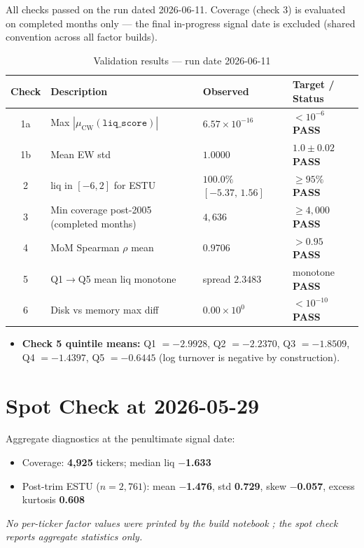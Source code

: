 \documentclass[11pt,a4paper]{article}
\newcommand{\PASS}[1]{\textcolor{pass}{\textbf{#1}}}
\newcommand{\NOTE}[1]{\textcolor{note}{\textit{#1}}}
\begin{document}
All checks passed on the run dated 2026-06-11. Coverage (check 3) is evaluated
on completed months only --- the final in-progress signal date is excluded
(shared convention across all factor builds).

\begin{table}[h!]
\centering
\caption{Validation results --- run date 2026-06-11}
\small
\begin{tabular}{clll}
\toprule
\textbf{Check} & \textbf{Description} & \textbf{Observed} & \textbf{Target / Status} \\
\midrule
1a & Max $|\mu_{\text{CW}}(\texttt{liq\_score})|$ & $6.57\times10^{-16}$ & $<10^{-6}$ \quad \PASS{PASS} \\
1b & Mean EW std & $1.0000$ & $1.0\pm0.02$ \quad \PASS{PASS} \\
2 & liq in $[-6,2]$ for ESTU & $100.0\%$ $[-5.37,\,1.56]$ & $\geq95\%$ \quad \PASS{PASS} \\
3 & Min coverage post-2005 (completed months) & $4{,}636$ & $\geq4{,}000$ \quad \PASS{PASS} \\
4 & MoM Spearman $\rho$ mean & $0.9706$ & $>0.95$ \quad \PASS{PASS} \\
5 & Q1$\to$Q5 mean liq monotone & spread $2.3483$ & monotone \quad \PASS{PASS} \\
6 & Disk vs memory max diff & $0.00\times10^{0}$ & $<10^{-10}$ \quad \PASS{PASS} \\
\bottomrule
\end{tabular}
\end{table}

\begin{itemize}[leftmargin=*,topsep=2pt,itemsep=2pt]
  \item \textbf{Check 5 quintile means:} Q1 $=-2.9928$, Q2 $=-2.2370$, Q3 $=-1.8509$, Q4 $=-1.4397$, Q5 $=-0.6445$ (log turnover is negative by construction).
\end{itemize}

\section{Spot Check at 2026-05-29}

Aggregate diagnostics at the penultimate signal date:

\begin{itemize}[leftmargin=*,topsep=2pt,itemsep=2pt]
  \item Coverage: \textbf{4{,}925} tickers; median liq \textbf{$-$1.633}
  \item Post-trim ESTU ($n=2{,}761$): mean \textbf{$-$1.476}, std \textbf{0.729}, skew \textbf{$-$0.057}, excess kurtosis \textbf{0.608}
\end{itemize}

\NOTE{No per-ticker factor values were printed by the build notebook
; the spot check reports aggregate statistics only.}
\end{document}
